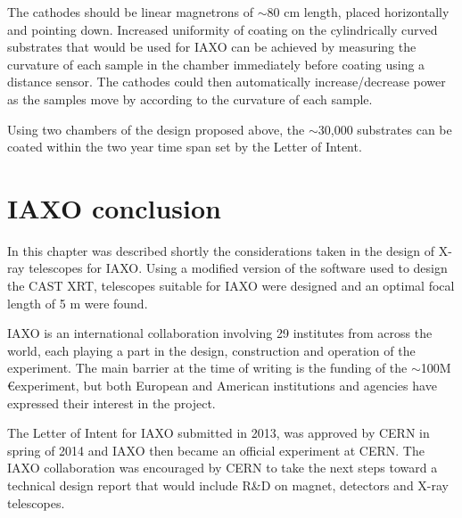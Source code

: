 The cathodes should be linear magnetrons of $\sim$80 cm length, placed horizontally and pointing down. Increased uniformity of coating on the cylindrically curved substrates that would be used for IAXO can be achieved by measuring the curvature of each sample in the chamber immediately before coating using a distance sensor. The cathodes could then automatically increase/decrease power as the samples move by according to the curvature of each sample.

Using two chambers of the design proposed above, the $\sim$30,000 substrates can be coated within the two year time span set by the Letter of Intent.

\section{IAXO conclusion}
In this chapter was described shortly the considerations taken in the design of X-ray telescopes for IAXO. Using a modified version of the software used to design the CAST XRT, telescopes suitable for IAXO were designed and an optimal focal length of 5 m were found.

IAXO is an international collaboration involving 29 institutes from across the world, each playing a part in the design, construction and operation of the experiment. The main barrier at the time of writing is the funding of the $\sim$100M \euro experiment, but both European and American institutions and agencies have expressed their interest in the project.

The Letter of Intent for IAXO submitted in 2013, was approved by CERN in spring of 2014 and IAXO then became an official experiment at CERN. The IAXO collaboration was encouraged by CERN to take the next steps toward a technical design report that would include R\&D on magnet, detectors and X-ray telescopes.
